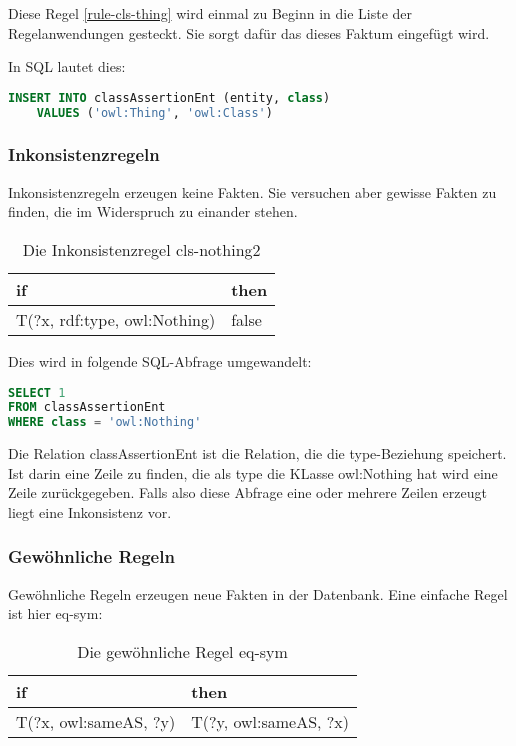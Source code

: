 Diese Regel \ref{rule-cls-thing} wird einmal zu Beginn in die Liste der Regelanwendungen gesteckt. Sie sorgt dafür das dieses Faktum eingefügt wird.

In SQL lautet dies:
\begin{lstlisting}[language=SQL]
INSERT INTO classAssertionEnt (entity, class)
	VALUES ('owl:Thing', 'owl:Class')
\end{lstlisting}

\subsubsection{Inkonsistenzregeln}
Inkonsistenzregeln erzeugen keine Fakten. Sie versuchen aber gewisse Fakten zu finden, die im Widerspruch zu einander stehen.

\begin{table}[htb]
\begin{center}
	\begin{tabular}{l|l}
	if & then \\ \hline
	T(?x, rdf:type, owl:Nothing) & false
	\end{tabular}
\end{center}
	\caption{Die Inkonsistenzregel cls-nothing2}
	\label{rule-cls-nothing2}
\end{table}


Dies wird in folgende SQL-Abfrage umgewandelt:
\begin{lstlisting}[language=SQL]
SELECT 1
FROM classAssertionEnt
WHERE class = 'owl:Nothing'
\end{lstlisting}

Die Relation classAssertionEnt ist die Relation, die die type-Beziehung speichert. Ist darin eine Zeile zu finden, die als type die KLasse owl:Nothing hat wird eine Zeile zurückgegeben. Falls also diese Abfrage eine oder mehrere Zeilen erzeugt liegt eine Inkonsistenz vor.

\subsubsection{Gewöhnliche Regeln}
Gewöhnliche Regeln erzeugen neue Fakten in der Datenbank. Eine einfache Regel ist hier eq-sym:

\begin{table}[htb]
\begin{center}
	\begin{tabular}{l|l}
	if & then \\ \hline
	T(?x, owl:sameAS, ?y) & T(?y, owl:sameAS, ?x)
	\end{tabular}
\end{center}
	\caption{Die gewöhnliche Regel eq-sym}
	\label{rule-eq-sym}
\end{table}

